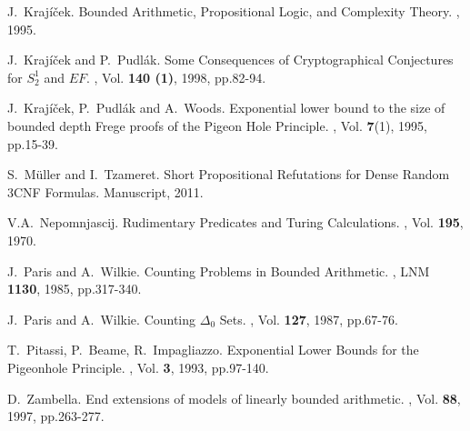 \documentclass{LMCS}
\begin{document}
\begin{thebibliography}{10}
J.~Kraj\' i\v cek.
\newblock Bounded Arithmetic, Propositional Logic, and Complexity Theory.
, 1995.

J.~Kraj\' i\v cek and P.~Pudl\' ak.
\newblock Some Consequences of Cryptographical Conjectures for $S^1_2$ and $EF$.
, Vol. {\bf 140 (1)}, 1998, pp.82-94.

J.~Kraj\' i\v cek, P.~Pudl\' ak and A.~Woods.
\newblock Exponential lower bound to the size of bounded depth Frege proofs
of the Pigeon Hole Principle.
, Vol. {\bf 7}(1), 1995, pp.15-39.

S.~M\" uller and I.~Tzameret.
\newblock Short Propositional Refutations for Dense Random 3CNF Formulas.
\newblock Manuscript, 2011.

V.A.~Nepomnjascij.
\newblock Rudimentary Predicates and Turing Calculations.
, Vol. {\bf 195}, 1970.

J.~Paris and A.~Wilkie.
\newblock Counting Problems in Bounded Arithmetic.
, LNM {\bf 1130}, 1985, pp.317-340.

J.~Paris and A.~Wilkie.
\newblock Counting $\Delta_0$ Sets.
, Vol. {\bf 127}, 1987, pp.67-76.

T.~Pitassi, P.~Beame, R.~Impagliazzo.
\newblock Exponential Lower Bounds for the Pigeonhole Principle.
, Vol. {\bf 3}, 1993, pp.97-140.

D.~Zambella.
\newblock End extensions of models of linearly bounded arithmetic.
, Vol. {\bf 88}, 1997, pp.263-277.

\end{thebibliography}
\end{document}

